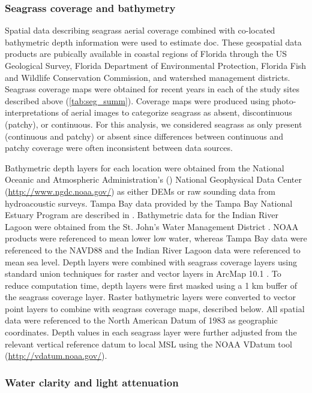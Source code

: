 \documentclass[letterpaper,12pt,oneside]{article}\usepackage[]{graphicx}\usepackage[]{color}
\begin{document}
\subsubsection{Seagrass coverage and bathymetry} \label{sec:data_srcs}

Spatial data describing seagrass aerial coverage combined with co-located bathymetric depth information were used to estimate \ac{doc}.  These geospatial data products are pubically available in coastal regions of Florida through the US Geological Survey, Florida Department of Environmental Protection, Florida Fish and Wildlife Conservation Commission, and watershed management districts.  Seagrass coverage maps were obtained for recent years in each of the study sites described above (\cref{tab:seg_summ}).  Coverage maps were produced using photo-interpretations of aerial images to categorize seagrass as absent, discontinuous (patchy), or continuous.  For this analysis, we considered seagrass as only present (continuous and patchy) or absent since differences between continuous and patchy coverage were often inconsistent between data sources. 

Bathymetric depth layers for each location were obtained from the National Oceanic and Atmospheric Administration's () National Geophysical Data Center (\url{http://www.ngdc.noaa.gov/}) as either \acp{DEM} or raw sounding data from hydroacoustic surveys.  Tampa Bay data provided by the Tampa Bay National Estuary Program are described in \citet{Tyler07}. Bathymetric data for the Indian River Lagoon were obtained from the St. John's Water Management District \citep{CPE97}.  \ac{NOAA} products were referenced to mean lower low water, whereas Tampa Bay data were referenced to the \ac{NAVD88} and the Indian River Lagoon data were referenced to mean sea level.  Depth layers were combined with seagrass coverage layers using standard union techniques for raster and vector layers in ArcMap 10.1 \citep{ESRI12}.  To reduce computation time, depth layers were first masked using a 1 km buffer of the seagrass coverage layer.  Raster bathymetric layers were converted to vector point layers to combine with seagrass coverage maps, described below.  All spatial data were referenced to the North American Datum of 1983 as geographic coordinates.  Depth values in each seagrass layer were further adjusted from the relevant vertical reference datum to local \ac{MSL} using the \ac{NOAA} VDatum tool (\url{http://vdatum.noaa.gov/}).

\subsubsection{Water clarity and light attenuation}
\end{document}

